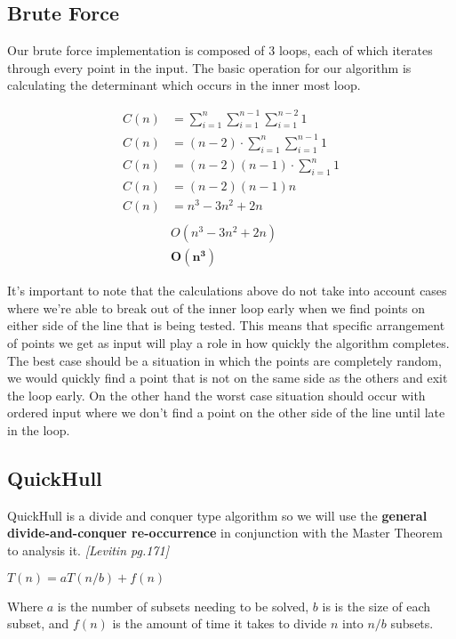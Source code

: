\documentclass[a4paper, 12pt]{article}
\begin{document}
{  \subsection{Brute Force}
  Our brute force implementation is composed of 3 loops, each of which iterates through every point in the input. The basic operation for our algorithm is calculating the determinant which occurs in the inner most loop.
  \begin{center}
    \begin{align*}
      C(n) &= \sum\limits_{i=1}^n \sum\limits_{i=1}^{n-1} \sum\limits_{i=1}^{n-2} 1 \\
      C(n) &= (n-2) \cdot \sum\limits_{i=1}^n \sum\limits_{i=1}^{n-1}1 \\ 
      C(n) &= (n-2)(n-1) \cdot \sum\limits_{i=1}^n 1 \\
      C(n) &= (n-2)(n-1)n \\
      C(n) &= n^3 - 3n^2 + 2n \\ \\
           &O(n^3 -3n^2 +2n) \\
           &\bm{O(n^3)}
    \end{align*}
  \end{center}
It's important to note that the calculations above do not take into account cases where we're able to break out of the inner loop early when we find points on either side of the line that is being tested.  This means that specific arrangement of points we get as input will play a role in how quickly the algorithm completes.  The best case should be a situation in which the points are completely random, we would quickly find a point that is not on the same side as the others and exit the loop early.  On the other hand the worst case situation should occur with ordered input where we don't find a point on the other side of the line until late in the loop.
  \subsection{QuickHull}
  QuickHull is a divide and conquer type algorithm so we will use the \textbf{general divide-and-conquer re-occurrence} in conjunction with the Master Theorem to analysis it. \textit{[Levitin pg.171]}

  \begin{center}
    $T(n) = aT(n/b) + f(n)$
  \end{center}

  Where $a$ is the number of subsets needing to be solved, $b$ is is the size of each subset, and $f(n)$ is the amount of time it takes to divide $n$ into $n/b$ subsets. \\ \\

}
\end{document}
